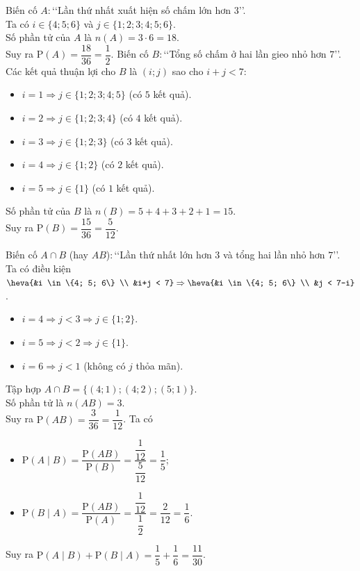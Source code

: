 \begin{ex}
{\begin{center}
\begin{tikzpicture}[scale=0.8,>=stealth]
			\end{tikzpicture}
		\end{center}
		\begin{itemchoice}
			\itemch Biến cố $A\colon$\lq\lq Lần thứ nhất xuất hiện số chấm lớn hơn $3$\rq\rq.\\
			Ta có $i \in \{4; 5; 6\}$ và $j \in \{1; 2; 3; 4; 5; 6\}$.\\
			Số phần tử của $A$ là $n(A) = 3\cdot6 = 18$.\\
			Suy ra $\mathrm{P}(A)=\dfrac{18}{36}=\dfrac{1}{2}$.
			\itemch Biến cố $B\colon$\lq\lq Tổng số chấm ở hai lần gieo nhỏ hơn $7$\rq\rq.\\
			Các kết quả thuận lợi cho $B$ là $(i; j)$ sao cho $i + j < 7$:
			\begin{itemize}
				\item $i=1 \Rightarrow j \in \{1; 2; 3; 4; 5\}$ (có $5$ kết quả).
				\item $i=2 \Rightarrow j \in \{1; 2; 3; 4\}$ (có $4$ kết quả).
				\item $i=3 \Rightarrow j \in \{1; 2; 3\}$ (có $3$ kết quả).
				\item $i=4 \Rightarrow j \in \{1; 2\}$ (có $2$ kết quả).
				\item $i=5 \Rightarrow j \in \{1\}$ (có $1$ kết quả).
			\end{itemize}
			Số phần tử của $B$ là $n(B) = 5+4+3+2+1 = 15$.\\
			Suy ra $\mathrm{P}(B)=\dfrac{15}{36}=\dfrac{5}{12}$.
			
			\itemch Biến cố $A \cap B$ (hay $AB$)$\colon$\lq\lq Lần thứ nhất lớn hơn $3$ và tổng hai lần nhỏ hơn $7$\rq\rq.\\
			Ta có điều kiện $\heva{&i \in \{4; 5; 6\} \\ &i+j < 7} \Rightarrow \heva{&i \in \{4; 5; 6\} \\ &j < 7-i}$.
			\begin{itemize}
				\item $i=4 \Rightarrow j < 3 \Rightarrow j \in \{1; 2\}$.
				\item $i=5 \Rightarrow j < 2 \Rightarrow j \in \{1\}$.
				\item $i=6 \Rightarrow j < 1$ (không có $j$ thỏa mãn).
			\end{itemize}
			Tập hợp $A \cap B = \{(4; 1); (4; 2); (5; 1)\}$. \\
			Số phần tử là $n(AB) = 3$.\\
			Suy ra $\mathrm{P}(AB) = \dfrac{3}{36} = \dfrac{1}{12}$.
			\itemch Ta có
			\begin{itemize}
				\item $\mathrm{P}(A \mid B) = \dfrac{\mathrm{P}(AB)}{\mathrm{P}(B)} = \dfrac{\dfrac{1}{12}}{\dfrac{5}{12}}=\dfrac{1}{5}$;
				\item $\mathrm{P}(B \mid A)=\dfrac{\mathrm{P}(AB)}{\mathrm{P}(A)}=\dfrac{\dfrac{1}{12}}{\dfrac{1}{2}}=\dfrac{2}{12}=\dfrac{1}{6}$.
			\end{itemize}
			Suy ra $\mathrm{P}(A \mid B) + \mathrm{P}(B \mid A)=\dfrac{1}{5}+\dfrac{1}{6}=\dfrac{11}{30}$.
		\end{itemchoice}
	}
\end{ex}
